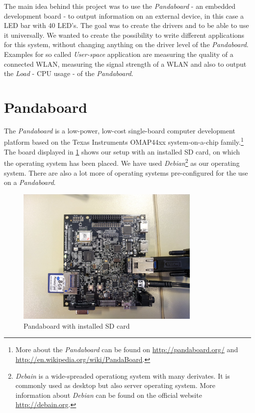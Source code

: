 The main idea behind this project was to use the \textit{Pandaboard} - an embedded development board - to output information on an external device, in this case a LED bar with 40 LED's. The goal was to create the drivers and to be able to use it universally. We wanted to create the possibility to write different applications for this system, without changing anything on the driver level of the \textit{Pandaboard}. 
Examples for so called \textit{User-space} application are measuring the quality of a connected WLAN, measuring the signal strength of a WLAN and also to output the \textit{Load} - CPU usage - of the \textit{Pandaboard}.

\section{Pandaboard}
The \textit{Pandaboard} is a low-power, low-cost single-board computer development platform based on the Texas Instruments OMAP44xx system-on-a-chip family.\footnote{More about the \textit{Pandaboard} can be found on \url{http://pandaboard.org/}  and  \url{http://en.wikipedia.org/wiki/PandaBoard}.} The board displayed in \ref{fig:pandaBoard_Alone} shows our setup with an installed SD card, on which the operating system has been placed. We have used \textit{Debian}\footnote{\textit{Debain} is a wide-spreaded operationg system with many derivates. It is commonly used as desktop but also server operating system. More information about \textit{Debian} can be found on the official website \url{http://debain.org}.} as our operating system. There are also a lot more of operating systems pre-configured for the use on a \textit{Pandaboard}.

\begin{figure}[H]
   \centering
   \includegraphics[width=0.8\textwidth]{img/Pandaboard_Alone.jpg}%
   \caption{Pandaboard with installed SD card}
   \label{fig:pandaBoard_Alone}%
\end{figure}

